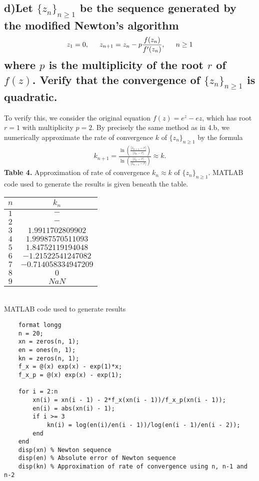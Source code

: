 \documentclass[11pt, letterpaper]{article}
\begin{document}
\subsection*{d)\normalfont Let $\{z_n\}_{n\geq 1}$ be the sequence generated by the modified Newton's algorithm
\begin{align*}
    z_1=0,\indent z_{n+1}=z_n-p\frac{f(z_n)}{f'(z_n)},\indent n\geq 1
\end{align*}
where $p$ is the multiplicity of the root $r$ of $f(z)$. Verify that the convergence of $\{z_n\}_{n\geq 1}$ is 
quadratic.}
To verify this, we consider the original equation $f(z)=e^z-ez$, which has root $r=1$ with multiplicity $p=2$.
By precisely the same method as in 4.b, we numerically approximate the rate of convergence $k$ of $\{z_n\}_{n\geq 1}$
by the formula
\begin{align*}
    k_{n+1}=\frac{\ln\left(\frac{|z_{n+1}-r|}{|z_n-r|}\right)}{\ln\left(\frac{|z_n-r|}{|z_{n-1}-r|}\right)}\approx k.
\end{align*}
{\bf Table 4.} Approximation of rate of convergence $k_n\approx k$ of $\{z_n\}_{n\geq 1}$. MATLAB code used to generate
the results is given beneath the table.
\begin{table}[h!]
    \begin{center}
        \begin{tabular}{c|c}
            $n$ & $k_n$\\
            \hline
            $1$ & $-$\\
            $2$ & $-$\\
            $3$ & $1.9911702809902$\\
            $4$ & $1.99987570511093$\\
            \hline
            $5$ & $1.84752119194048$\\
            $6$ & $-1.21522541247082$\\
            $7$ & $-0.714058334947209$\\
            $8$ & $0$\\
            $9$ & $NaN$\\
        \end{tabular}
    \end{center}
\end{table}\\
MATLAB code used to generate results
\begin{verbatim}
    format longg
    n = 20;
    xn = zeros(n, 1);
    en = ones(n, 1);
    kn = zeros(n, 1);
    f_x = @(x) exp(x) - exp(1)*x;
    f_x_p = @(x) exp(x) - exp(1);

    for i = 2:n
        xn(i) = xn(i - 1) - 2*f_x(xn(i - 1))/f_x_p(xn(i - 1));
        en(i) = abs(xn(i) - 1);
        if i >= 3
            kn(i) = log(en(i)/en(i - 1))/log(en(i - 1)/en(i - 2));
        end
    end
    disp(xn) % Newton sequence
    disp(en) % Absolute error of Newton sequence
    disp(kn) % Approximation of rate of convergence using n, n-1 and n-2
\end{verbatim}
\end{document}
